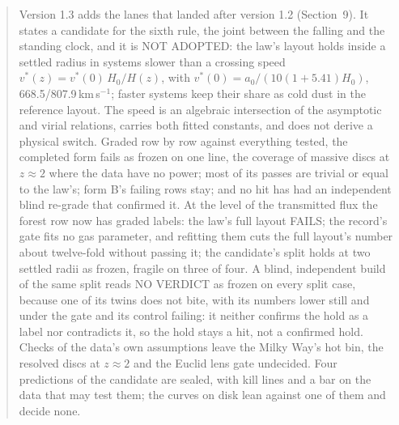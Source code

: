 \documentclass[10pt]{article}
\begin{document}
\begin{abstract}
Version 1.3 adds the lanes that landed after version 1.2 (Section~9). It states a candidate for the sixth rule, the joint between the falling and the standing clock, and it is NOT ADOPTED: the law's layout holds inside a settled radius in systems slower than a crossing speed $v^*(z)=v^*(0)\,H_0/H(z)$, with $v^*(0)=a_0/(10(1+5.41)H_0)$, 668.5/807.9\,km\,s$^{-1}$; faster systems keep their share as cold dust in the reference layout. The speed is an algebraic intersection of the asymptotic and virial relations, carries both fitted constants, and does not derive a physical switch.
Graded row by row against everything tested, the completed form fails as frozen on one line, the coverage of massive discs at $z\approx2$ where the data have no power; most of its passes are trivial or equal to the law's; form B's failing rows stay; and no hit has had an independent blind re-grade that confirmed it.
At the level of the transmitted flux the forest row now has graded labels: the law's full layout FAILS; the record's gate fits no gas parameter, and refitting them cuts the full layout's number about twelve-fold without passing it; the candidate's split holds at two settled radii as frozen, fragile on three of four. A blind, independent build of the same split reads NO VERDICT as frozen on every split case, because one of its twins does not bite, with its numbers lower still and under the gate and its control failing: it neither confirms the hold as a label nor contradicts it, so the hold stays a hit, not a confirmed hold.
Checks of the data's own assumptions leave the Milky Way's hot bin, the resolved discs at $z\approx2$ and the Euclid lens gate undecided. Four predictions of the candidate are sealed, with kill lines and a bar on the data that may test them; the curves on disk lean against one of them and decide none.


\end{abstract}
\end{document}

